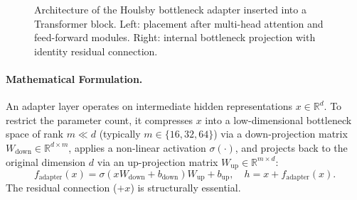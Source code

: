 \documentclass[../../../main.tex]{subfiles}
\begin{document}
\begin{figure}[htbp]
\caption{Architecture of the Houlsby bottleneck adapter inserted into a Transformer block. Left: placement after multi-head attention and feed-forward modules. Right: internal bottleneck projection with identity residual connection.}
\label{fig:adapter_bottleneck_architecture}
\end{figure}

\paragraph{Mathematical Formulation.}
An adapter layer operates on intermediate hidden representations $x \in \mathbb{R}^d$. To restrict the parameter count, it compresses $x$ into a low-dimensional bottleneck space of rank $m \ll d$ (typically $m \in \{16, 32, 64\}$) via a down-projection matrix $W_{\text{down}} \in \mathbb{R}^{d \times m}$, applies a non-linear activation $\sigma(\cdot)$, and projects back to the original dimension $d$ via an up-projection matrix $W_{\text{up}} \in \mathbb{R}^{m \times d}$:
\begin{equation}
\label{eq:adapter_forward}
f_{\text{adapter}}(x) = \sigma(x W_{\text{down}} + b_{\text{down}}) W_{\text{up}} + b_{\text{up}}, \quad h = x + f_{\text{adapter}}(x).
\end{equation}
The residual connection ($+ x$) is structurally essential.
\end{document}
